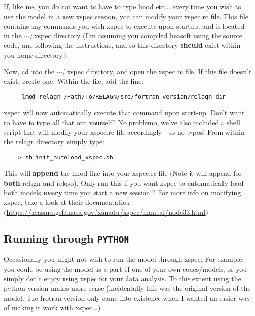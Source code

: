 \documentclass[a4paper, 11pt, times, onecolumn]{article}
\begin{document}
If, like me, you do not want to have to type {\sc lmod etc...} every time you wish to use the model in a new {\sc xspec} session, you can modify your {\sc xspec.rc} file. This file contains any commands you wish {\sc xspec} to execute upon startup, and is located in the {\sc $\sim$/.xspec} directory (I'm assuming you compiled {\sc heasoft} using the source code, and following the instructions, and so this directory {\bf should} exist within you home directory.).

Now, cd into the {\sc $\sim$/.xspec} directory, and open the xspec.rc file. If this file doesn't exist, create one. Within the file, add the line:

\begin{verbatim}
	 lmod relagn /Path/To/RELAGN/src/fortran_version/relagn_dir
\end{verbatim}

\noindent
{\sc xspec} will now automatically execute that command upon start-up.  
Don't want to have to type all that out yourself? No problemo, we've also included a shell script that will modify your xspec.rc file accordingly - so no typos! From within the {\sc relagn} directory, simply type:

\begin{verbatim}
	> sh init_autoLoad_xspec.sh
\end{verbatim}

\noindent
This will {\bf append} the lmod line into your xspec.rc file (Note it will append for {\bf both} {\sc relagn} and {\sc relqso}). Only run this if you want {\sc xspec} to automatically load both models {\bf every} time you start a new session!!! For more info on modifying {\sc xspec}, take a look at their documentation (\url{https://heasarc.gsfc.nasa.gov/xanadu/xspec/manual/node33.html})





\subsection{Running through {\tt PYTHON}}

Occasionally you might not wish to run the model through {\sc xspec}. For example, you could be using the model as a part of one of your own codes/models, or you simply don't enjoy using {\sc xspec} for your data analysis. To this extent using the {\sc python} version makes more sense (incidentally this was the original version of the model. The {\sc frotran} version only came into existence when I wanted an easier way of making it work with {\sc xspec}...) 
\end{document}
